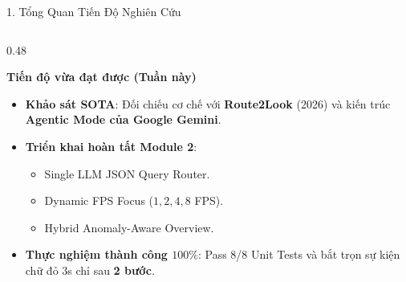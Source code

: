 \documentclass[aspectratio=169, 10pt]{beamer}
\begin{document}
\begin{frame}{1. Tổng Quan Tiến Độ Nghiên Cứu}
\begin{columns}[T]
        \begin{column}{0.48\textwidth}
            \begin{exampleblock}{\textbf{Tiến độ vừa đạt được (Tuần này)}}
                \begin{itemize}
                    \item \textbf{Khảo sát SOTA}: Đối chiếu cơ chế với \textbf{Route2Look} (2026) và kiến trúc \textbf{Agentic Mode của Google Gemini}.
                    \item \textbf{Triển khai hoàn tất Module 2}:
                    \begin{itemize}
                        \item Single LLM JSON Query Router.
                        \item Dynamic FPS Focus ($1, 2, 4, 8$ FPS).
                        \item Hybrid Anomaly-Aware Overview.
                    \end{itemize}
                    \item \textbf{Thực nghiệm thành công $100\%$}: Pass 8/8 Unit Tests và bắt trọn sự kiện chữ đỏ 3s chỉ sau \textbf{2 bước}.
                \end{itemize}
            \end{exampleblock}
        \end{column}
    \end{columns}
\end{frame}
\end{document}
